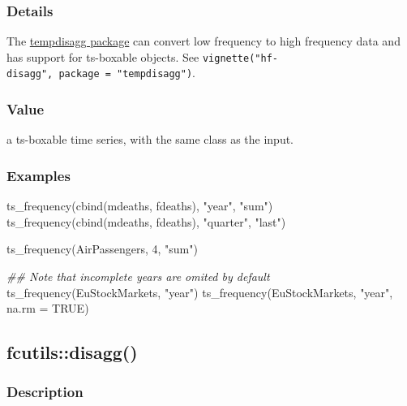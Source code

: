 \documentclass[
  letterpaper,
  DIV=11,
  numbers=noendperiod]{scrreport}
\newenvironment{Shaded}{\begin{snugshade}}{\end{snugshade}}
\newcommand{\AttributeTok}[1]{\textcolor[rgb]{0.40,0.45,0.13}{#1}}
\newcommand{\ConstantTok}[1]{\textcolor[rgb]{0.56,0.35,0.01}{#1}}
\newcommand{\DecValTok}[1]{\textcolor[rgb]{0.68,0.00,0.00}{#1}}
\newcommand{\DocumentationTok}[1]{\textcolor[rgb]{0.37,0.37,0.37}{\textit{#1}}}
\newcommand{\FunctionTok}[1]{\textcolor[rgb]{0.28,0.35,0.67}{#1}}
\newcommand{\NormalTok}[1]{\textcolor[rgb]{0.00,0.23,0.31}{#1}}
\newcommand{\StringTok}[1]{\textcolor[rgb]{0.13,0.47,0.30}{#1}}
\begin{document}
\subsubsection{Details}\label{details-9}

The \href{https://CRAN.R-project.org/package=tempdisagg}{tempdisagg
package} can convert low frequency to high frequency data and has
support for ts-boxable objects. See
\texttt{vignette("hf-disagg",\ package\ =\ "tempdisagg")}.

\subsubsection{Value}\label{value-25}

a ts-boxable time series, with the same class as the input.

\subsubsection{Examples}\label{examples-25}

\begin{Shaded}
\begin{Highlighting}[]
\FunctionTok{ts\_frequency}\NormalTok{(}\FunctionTok{cbind}\NormalTok{(mdeaths, fdeaths), }\StringTok{"year"}\NormalTok{, }\StringTok{"sum"}\NormalTok{)}
\FunctionTok{ts\_frequency}\NormalTok{(}\FunctionTok{cbind}\NormalTok{(mdeaths, fdeaths), }\StringTok{"quarter"}\NormalTok{, }\StringTok{"last"}\NormalTok{)}

\FunctionTok{ts\_frequency}\NormalTok{(AirPassengers, }\DecValTok{4}\NormalTok{, }\StringTok{"sum"}\NormalTok{)}

\DocumentationTok{\#\# Note that incomplete years are omited by default}
\FunctionTok{ts\_frequency}\NormalTok{(EuStockMarkets, }\StringTok{"year"}\NormalTok{)}
\FunctionTok{ts\_frequency}\NormalTok{(EuStockMarkets, }\StringTok{"year"}\NormalTok{, }\AttributeTok{na.rm =} \ConstantTok{TRUE}\NormalTok{)}
\end{Highlighting}
\end{Shaded}

\subsection{fcutils::disagg()}\label{fcutilsdisagg}

\subsubsection{Description}\label{description-26}
\end{document}
